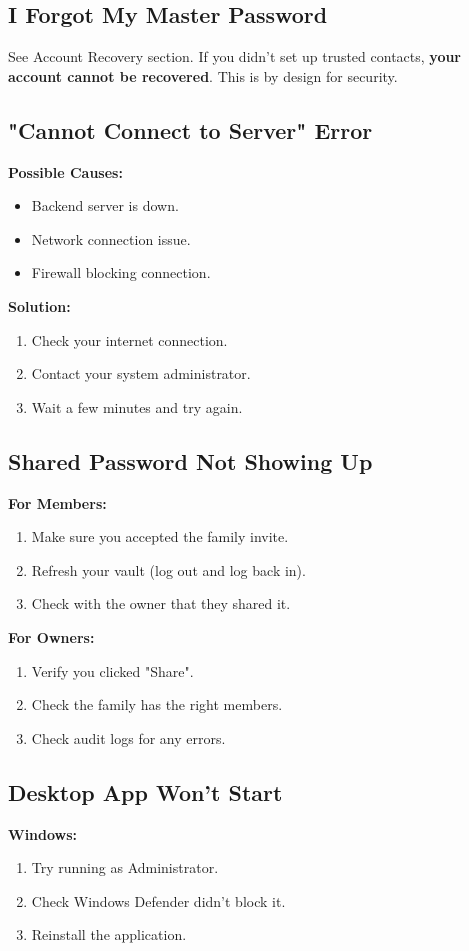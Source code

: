 \documentclass[11pt,a4paper]{article}
\begin{document}
\subsection{I Forgot My Master Password}
See Account Recovery section. If you didn't set up trusted contacts, \textbf{your account cannot be recovered}. This is by design for security.


\subsection{"Cannot Connect to Server" Error}
\textbf{Possible Causes:}
\begin{itemize}
    \item Backend server is down.
    \item Network connection issue.
    \item Firewall blocking connection.
\end{itemize}

\textbf{Solution:}
\begin{enumerate}
    \item Check your internet connection.
    \item Contact your system administrator.
    \item Wait a few minutes and try again.
\end{enumerate}

\subsection{Shared Password Not Showing Up}
\textbf{For Members:}
\begin{enumerate}
    \item Make sure you accepted the family invite.
    \item Refresh your vault (log out and log back in).
    \item Check with the owner that they shared it.
\end{enumerate}

\textbf{For Owners:}
\begin{enumerate}
    \item Verify you clicked "Share".
    \item Check the family has the right members.
    \item Check audit logs for any errors.
\end{enumerate}

\subsection{Desktop App Won't Start}
\textbf{Windows:}
\begin{enumerate}
    \item Try running as Administrator.
    \item Check Windows Defender didn't block it.
    \item Reinstall the application.
\end{enumerate}
\end{document}
